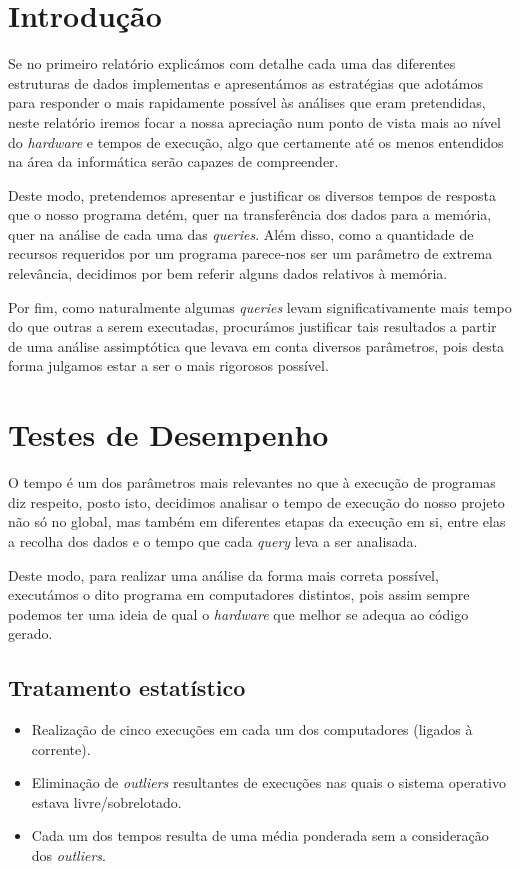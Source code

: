 \documentclass[12pt,a4paper]{report}
\begin{document}
\chapter{Introdução}

Se no primeiro relatório explicámos com detalhe cada uma das diferentes estruturas de dados implementas e apresentámos as estratégias que adotámos para responder o mais rapidamente possível às análises que eram pretendidas, neste relatório iremos focar a nossa apreciação num ponto de vista mais ao nível do \textit{hardware} e tempos de execução, algo que certamente até os menos entendidos na área da informática serão capazes de compreender.

Deste modo, pretendemos apresentar e justificar os diversos tempos de resposta que o nosso programa detém, quer na transferência dos dados para a memória, quer na análise de cada uma das \textit{queries}. Além disso, como a quantidade de recursos requeridos por um programa parece-nos ser um parâmetro de extrema relevância, decidimos por bem referir alguns dados relativos à memória.

Por fim, como naturalmente algumas \textit{queries} levam significativamente mais tempo do que outras a serem executadas, procurámos justificar tais resultados a partir de uma análise assimptótica que levava em conta diversos parâmetros, pois desta forma julgamos estar a ser o mais rigorosos possível.

\chapter{Testes de Desempenho}

O tempo é um dos parâmetros mais relevantes no que à execução de programas diz respeito, posto isto, decidimos analisar o tempo de execução do nosso projeto não só no global, mas também em diferentes etapas da execução em si, entre elas a recolha dos dados e o tempo que cada \textit{query} leva a ser analisada.

Deste modo, para realizar uma análise da forma mais correta possível, executámos o dito programa em computadores distintos, pois assim sempre podemos ter uma ideia de qual o \textit{hardware} que melhor se adequa ao código gerado.


\section{Tratamento estatístico}

\begin{itemize}
    
    \item Realização de cinco execuções em cada um dos computadores (ligados à corrente).
    
    \item Eliminação de \textit{outliers} resultantes de execuções nas quais o sistema operativo estava livre/sobrelotado.

    \item Cada um dos tempos resulta de uma média ponderada sem a consideração dos \textit{outliers}. 
\end{itemize}
\end{document}
